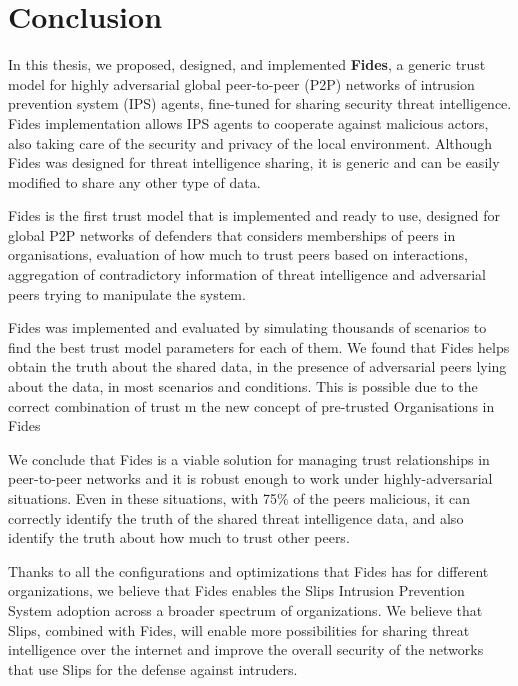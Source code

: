 \chapter{Conclusion}
\label{ch:conclusion}

In this thesis, we proposed, designed, and implemented \textbf{Fides}, a generic trust model for highly adversarial global peer-to-peer (P2P) networks of intrusion prevention system (IPS) agents, fine-tuned for sharing security threat intelligence. Fides implementation allows IPS agents to cooperate against malicious actors, also taking care of the security and privacy of the local environment. 
Although Fides was designed for threat intelligence sharing, it is generic and can be easily modified to share any other type of data. 

Fides is the first trust model that is implemented and ready to use, designed for global P2P networks of defenders that considers memberships of peers in organisations, evaluation of how much to trust peers based on interactions, aggregation of contradictory information of threat intelligence and adversarial peers trying to manipulate the system.

Fides was implemented and evaluated by simulating thousands of scenarios to find the best trust model parameters for each of them. We found that Fides helps obtain the truth about the shared data, in the presence of adversarial peers lying about the data, in most scenarios and conditions. This is possible due to the correct combination of trust m the new concept of pre-trusted Organisations in Fides 

We conclude that Fides is a viable solution for managing trust relationships in peer-to-peer networks and it is robust enough to work under highly-adversarial situations. Even in these situations, with 75\% of the peers malicious, it can correctly identify the truth of the shared threat intelligence data, and also identify the truth about how much to trust other peers.

Thanks to all the configurations and optimizations that Fides has for different organizations, we believe that Fides enables the Slips Intrusion Prevention System adoption across a broader spectrum of organizations.
We believe that Slips, combined with Fides, will enable more possibilities for sharing threat intelligence over the internet and improve the overall security of the networks that use Slips for the defense against intruders.


